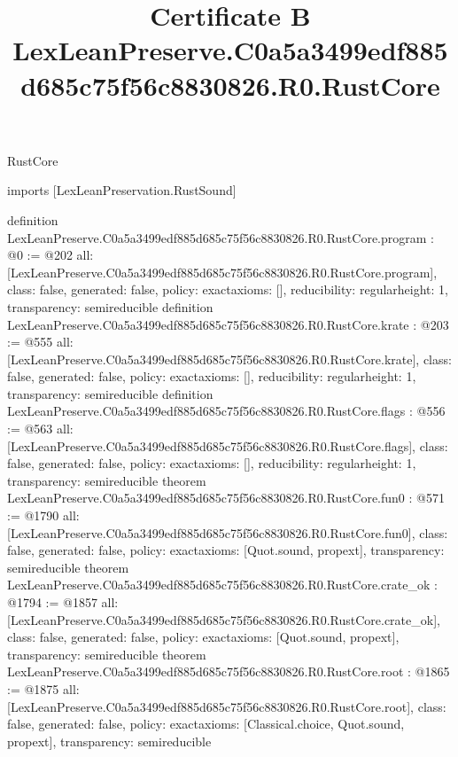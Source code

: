 \begin{lexlean}{RustCore}
\title{Certificate B LexLeanPreserve.C0a5a3499edf885d685c75f56c8830826.R0.RustCore}
\begin{coremodule}
imports [LexLeanPreservation.RustSound]

definition LexLeanPreserve.C0a5a3499edf885d685c75f56c8830826.R0.RustCore.program : @0 := @202 {
  all: [LexLeanPreserve.C0a5a3499edf885d685c75f56c8830826.R0.RustCore.program],
  class: false,
  generated: false,
  policy: exact{axioms: []},
  reducibility: regular{height: 1},
  transparency: semireducible
}
definition LexLeanPreserve.C0a5a3499edf885d685c75f56c8830826.R0.RustCore.krate : @203 := @555 {
  all: [LexLeanPreserve.C0a5a3499edf885d685c75f56c8830826.R0.RustCore.krate],
  class: false,
  generated: false,
  policy: exact{axioms: []},
  reducibility: regular{height: 1},
  transparency: semireducible
}
definition LexLeanPreserve.C0a5a3499edf885d685c75f56c8830826.R0.RustCore.flags : @556 := @563 {
  all: [LexLeanPreserve.C0a5a3499edf885d685c75f56c8830826.R0.RustCore.flags],
  class: false,
  generated: false,
  policy: exact{axioms: []},
  reducibility: regular{height: 1},
  transparency: semireducible
}
theorem LexLeanPreserve.C0a5a3499edf885d685c75f56c8830826.R0.RustCore.fun0 : @571 := @1790 {
  all: [LexLeanPreserve.C0a5a3499edf885d685c75f56c8830826.R0.RustCore.fun0],
  class: false,
  generated: false,
  policy: exact{axioms: [Quot.sound, propext]},
  transparency: semireducible
}
theorem LexLeanPreserve.C0a5a3499edf885d685c75f56c8830826.R0.RustCore.crate_ok : @1794 := @1857 {
  all: [LexLeanPreserve.C0a5a3499edf885d685c75f56c8830826.R0.RustCore.crate_ok],
  class: false,
  generated: false,
  policy: exact{axioms: [Quot.sound, propext]},
  transparency: semireducible
}
theorem LexLeanPreserve.C0a5a3499edf885d685c75f56c8830826.R0.RustCore.root : @1865 := @1875 {
  all: [LexLeanPreserve.C0a5a3499edf885d685c75f56c8830826.R0.RustCore.root],
  class: false,
  generated: false,
  policy: exact{axioms: [Classical.choice, Quot.sound, propext]},
  transparency: semireducible
}


\end{coremodule}
\end{lexlean}
